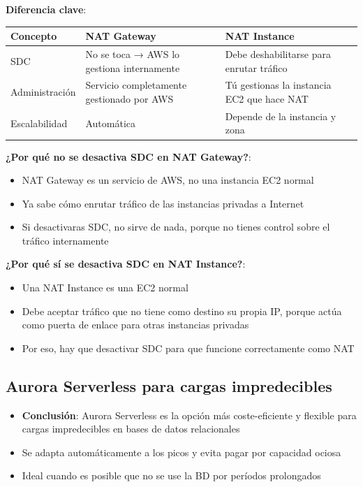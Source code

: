 \documentclass[12pt,a4paper]{report}
\begin{document}
\textbf{Diferencia clave}:

\begin{center}
\begin{longtable}{|p{3cm}|p{5cm}|p{5cm}|}
\hline
\cellcolor{awsblue!20}\textbf{Concepto} & \cellcolor{awsblue!20}\textbf{NAT Gateway} & \cellcolor{awsblue!20}\textbf{NAT Instance} \\
\hline
SDC & No se toca → AWS lo gestiona internamente & Debe deshabilitarse para enrutar tráfico \\
\hline
Administración & Servicio completamente gestionado por AWS & Tú gestionas la instancia EC2 que hace NAT \\
\hline
Escalabilidad & Automática & Depende de la instancia y zona \\
\hline
\end{longtable}
\end{center}

\textbf{¿Por qué no se desactiva SDC en NAT Gateway?}:
\begin{itemize}
    \item NAT Gateway es un servicio de AWS, no una instancia EC2 normal
    \item Ya sabe cómo enrutar tráfico de las instancias privadas a Internet
    \item Si desactivaras SDC, no sirve de nada, porque no tienes control sobre el tráfico internamente
\end{itemize}

\textbf{¿Por qué sí se desactiva SDC en NAT Instance?}:
\begin{itemize}
    \item Una NAT Instance es una EC2 normal
    \item Debe aceptar tráfico que no tiene como destino su propia IP, porque actúa como puerta de enlace para otras instancias privadas
    \item Por eso, hay que desactivar SDC para que funcione correctamente como NAT
\end{itemize}

\subsection{Aurora Serverless para cargas impredecibles}

\begin{itemize}
    \item \textbf{Conclusión}: Aurora Serverless es la opción más coste-eficiente y flexible para cargas impredecibles en bases de datos relacionales
    \item Se adapta automáticamente a los picos y evita pagar por capacidad ociosa
    \item Ideal cuando es posible que no se use la BD por períodos prolongados
\end{itemize}
\end{document}
